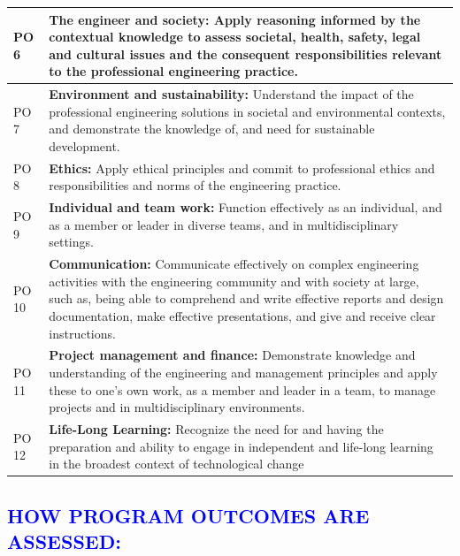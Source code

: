 \documentclass[11pt]{exam}
\begin{document}
\begin{flushleft}
\begin{longtable}{|>{\centering\arraybackslash}p{1.6cm}  | >{\raggedright\arraybackslash}p{14cm}  | }
		PO 6& \textbf{The  engineer  and  society:} Apply reasoning informed by the contextual knowledge to assess 
		societal,  health,  safety,  legal  and  cultural  issues  and  the  consequent  responsibilities  relevant  to 
		the professional engineering practice. \\ \hline
		PO 7&  \textbf{Environment  and  sustainability:}  Understand  the  impact  of  the  professional  engineering 
		solutions  in  societal  and  environmental  contexts,  and  demonstrate  the  knowledge  of,  and  need 
		for sustainable development. \\ \hline
		PO 8& \textbf{Ethics:}  Apply  ethical  principles  and  commit  to  professional  ethics  and  responsibilities  and 
		norms of the engineering practice. \\ \hline
		PO 9& \textbf{Individual and team work:} Function effectively as an individual, and as a member or leader 
		in diverse teams, and in multidisciplinary settings. \\ \hline
		PO 10&  \textbf{Communication: } Communicate  effectively  on  complex  engineering  activities  with  the 
		engineering  community  and  with  society  at  large,  such  as,  being  able  to  comprehend  and  write 
		effective  reports  and  design  documentation,  make  effective  presentations,  and  give  and  receive 
		clear instructions. \\ \hline
		PO 11&  \textbf{Project management  and  finance: } Demonstrate  knowledge  and  understanding  of  the 
		engineering  and  management  principles  and  apply  these  to  one’s  own  work,  as  a  member  and 
		leader in a team, to manage projects and in multidisciplinary environments. \\ \hline
		PO 12&	\textbf{Life-Long Learning:} Recognize the need for and having the preparation and ability to engage in independent and life-long learning in the broadest context of technological change\\ \hline
	\end{longtable}
\end{flushleft}\newpage
\textcolor{blue}{\section{\large \bfseries HOW PROGRAM OUTCOMES ARE ASSESSED:}}
\end{document}
